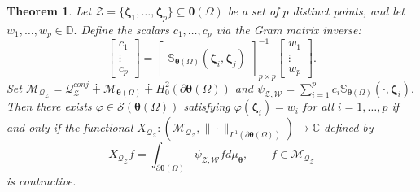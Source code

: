 \documentclass[10pt,a4paper]{amsart}
\newtheorem{theorem}{Theorem}
\begin{document}
\begin{theorem}\label{interpolation 1st}
    Let $\mathcal{Z}=\{\boldsymbol \zeta_1,\ldots,\boldsymbol \zeta_p\}\subseteq \boldsymbol \theta(\Omega)$ be a set of $p$ distinct points, and let $w_1,\ldots,w_p\in \mathbb D.$
Define the scalars $c_1,\ldots,c_p$ via the Gram matrix inverse:
    $$\begin{bmatrix}
            c_1 \\  \vdots\\ c_p 
        \end{bmatrix}= {\begin{bmatrix}
            \mathbb S_{\boldsymbol \theta(\Omega)}(\boldsymbol \zeta_i, \boldsymbol \zeta_j)
        \end{bmatrix}}_{p\times p}^{-1} \begin{bmatrix}
            w_1 \\ \vdots \\w_p
        \end{bmatrix}.$$
    Set $\mathcal{M}_{\mathcal{Q}_{\mathcal{Z}}}=\mathcal{Q}_{\mathcal{Z}}^{conj} \dotplus \mathcal{M}_{\boldsymbol \theta(\Omega)}\dotplus H^2_{0}(\partial\boldsymbol \theta(\Omega))$ and $\psi_{\mathcal{Z}, \mathcal{W}}=\sum_{i=1}^p c_i \mathbb S_{\boldsymbol \theta(\Omega)}(\cdot, \boldsymbol \zeta_i). $ 
    Then there exists $\varphi\in \mathcal{S}(\boldsymbol \theta(\Omega))$ satisfying $\varphi(\boldsymbol \zeta_i)=w_i$ for all $i=1,\ldots,p$ if and only if the functional $X_{\mathcal{Q_{\mathcal{Z}}}}: \left(\mathcal{M}_{\mathcal{Q}_{\mathcal{Z}}}, \|\cdot \|_{L^1(\partial\boldsymbol \theta(\Omega))}\right) \to \mathbb C$ defined by $$X_{\mathcal{Q_{\mathcal{Z}}}} f=\int_{\partial\boldsymbol \theta(\Omega)} \psi_{\mathcal{Z}, \mathcal{W}} fd\mu_{\boldsymbol \theta}, \qquad f\in \mathcal{M}_{\mathcal{Q}_{\mathcal{Z}}}$$ is contractive.
     \end{theorem}
\end{document}
